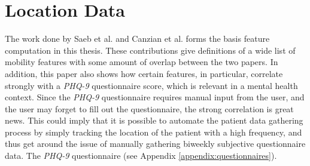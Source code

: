 \section{Location Data}

The work done by Saeb et al. \cite{Saeb2015} and Canzian et al. \cite{Canzian2015} forms the basis feature computation in this thesis. These contributions give definitions of a wide list of mobility features with some amount of overlap between the two papers. In addition, this paper also shows how certain features, in particular, correlate strongly with a \textit{PHQ-9} questionnaire score, which is relevant in a mental health context. Since the \textit{PHQ-9} questionnaire requires manual input from the user, and the user may forget to fill out the questionnaire, the strong correlation is great news. This could imply that it is possible to automate the patient data gathering process by simply tracking the location of the patient with a high frequency, and thus get around the issue of manually gathering biweekly subjective questionnaire data. The \textit{PHQ-9} questionnaire (see Appendix \ref{appendix:questionnaires}).

